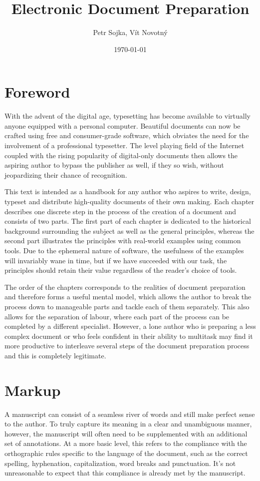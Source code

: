 \documentclass{book}
\title{Electronic Document Preparation}
\author{Petr Sojka, Vít Novotný}
\date{\today}
\begin{document}
  \frontmatter
    \maketitle
    \tableofcontents
  \mainmatter
    \chapter{Foreword}
      With the advent of the digital age, typesetting has become available to
      virtually anyone equipped with a personal computer. Beautiful documents
      can now be crafted using free and consumer-grade software, which obviates
      the need for the involvement of a professional typesetter. The level
      playing field of the Internet coupled with the rising popularity of
      digital-only documents then allows the aspiring author to bypass the
      publisher as well, if they so wish, without jeopardizing their chance of
      recognition.
      
      This text is intended as a handbook for any author who aspires to write,
      design, typeset and distribute high-quality documents of their own making.
      Each chapter describes one discrete step in the process of the creation of
      a document and consists of two parts. The first part of each chapter is
      dedicated to the historical background surrounding the subject as well as
      the general principles, whereas the second part illustrates the principles
      with real-world examples using common tools. Due to the ephemeral nature
      of software, the usefulness of the examples will invariably wane in time,
      but if we have succeeded with our task, the principles should retain their
      value regardless of the reader's choice of tools.

      The order of the chapters corresponds to the realities of document
      preparation and therefore forms a useful mental model, which allows the
      author to break the process down to manageable parts and tackle each of
      them separately. This also allows for the separation of labour, where
      each part of the process can be completed by a different specialist.
      However, a lone author who is preparing a less complex document or who
      feels confident in their ability to multitask may find it more productive
      to interleave several steps of the document preparation process and this
      is completely legitimate.

    \chapter{Markup}
      A manuscript can consist of a seamless river of words and still make
      perfect sense to the author. To truly capture its meaning in a clear and
      unambiguous manner, however, the manuscript will often need to be
      supplemented with an additional set of annotations. At a more basic level,
      this refers to the compliance with the orthographic rules specific to the
      language of the document, such as the correct spelling, hyphenation,
      capitalization, word breaks and punctuation. It's not unreasonable to
      expect that this compliance is already met by the manuscript.
      
\end{document}
